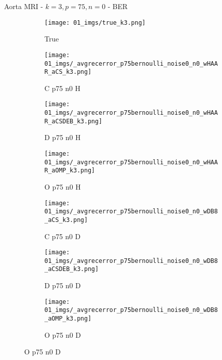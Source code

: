 \begin{frame}{Aorta MRI - $k=3,p=75,n=0$ - BER}{}
\begin{figure}
\begin{subfigure}{0.13\textwidth}
\texttt{[image: 01\_imgs/true\_k3.png]}
\caption*{\tiny True}
\end{subfigure}
\begin{subfigure}{0.13\textwidth}
\texttt{[image: 01\_imgs/\_avgrecerror\_p75bernoulli\_noise0\_n0\_wHAAR\_aCS\_k3.png]}
\caption*{\tiny C p75 n0 H}
\end{subfigure}
\begin{subfigure}{0.13\textwidth}
\texttt{[image: 01\_imgs/\_avgrecerror\_p75bernoulli\_noise0\_n0\_wHAAR\_aCSDEB\_k3.png]}
\caption*{\tiny D p75 n0 H}
\end{subfigure}
\begin{subfigure}{0.13\textwidth}
\texttt{[image: 01\_imgs/\_avgrecerror\_p75bernoulli\_noise0\_n0\_wHAAR\_aOMP\_k3.png]}
\caption*{\tiny O p75 n0 H}
\end{subfigure}
\begin{subfigure}{0.13\textwidth}
\texttt{[image: 01\_imgs/\_avgrecerror\_p75bernoulli\_noise0\_n0\_wDB8\_aCS\_k3.png]}
\caption*{\tiny C p75 n0 D}
\end{subfigure}
\begin{subfigure}{0.13\textwidth}
\texttt{[image: 01\_imgs/\_avgrecerror\_p75bernoulli\_noise0\_n0\_wDB8\_aCSDEB\_k3.png]}
\caption*{\tiny D p75 n0 D}
\end{subfigure}
\begin{subfigure}{0.13\textwidth}
\texttt{[image: 01\_imgs/\_avgrecerror\_p75bernoulli\_noise0\_n0\_wDB8\_aOMP\_k3.png]}
\caption*{\tiny O p75 n0 D}
\end{subfigure}

\vspace{5pt}


\end{figure}
\end{frame}
